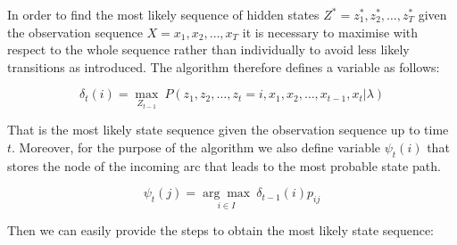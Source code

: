 In order to find the most likely sequence of hidden states $Z^*={z_1^*,z_2^*,\ldots,z_T^*}$ given the observation sequence $X={x_1,x_2,\ldots,x_T}$ it is necessary to maximise with respect to the whole sequence rather than individually to avoid less likely transitions as introduced. The algorithm therefore defines a variable as follows:

\begin{equation}
\delta_t(i) = \underset{Z_{t-1}}{\max}\:P(z_1,z_2,\ldots,z_t=i,x_1,x_2,\ldots,x_{t-1},x_{t}|\lambda)
\end{equation}

That is the most likely state sequence given the observation sequence up to time $t$. Moreover, for the purpose of the algorithm we also define variable $\psi_t(i)$ that stores the node of the incoming arc that leads to the most probable state path.

\begin{equation}
\psi_t(j) = \underset{i \in I}{\arg\max} \: \delta_{t-1}(i)p_{ij}
\end{equation}

\vspace{0.3cm}

\noindent
Then we can easily provide the steps to obtain the most likely state sequence:

